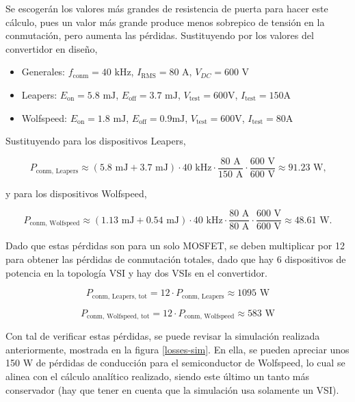 Se escogerán los valores más grandes de resistencia de puerta para hacer este cálculo, pues un valor más grande produce menos sobrepico de tensión en la conmutación, pero aumenta las pérdidas. Sustituyendo por los valores del convertidor en diseño,

\begin{itemize}
	\item Generales: \(f_{\text{conm}} = 40 \text{ kHz}\), \(I_{\text{RMS}} = 80 \text{ A}\), \(V_{DC} = 600 \text{ V}\)
	\item Leapers: \(E_{\text{on}} = 5.8 \text{ mJ}\), \(E_{\text{off}} = 3.7 \text{ mJ}\), \(V_{\text{test}} = 600 \text{V}\), \(I_{\text{test}} = 150 \text{A}\)
	\item Wolfspeed: \(E_{\text{on}} = 1.8 \text{ mJ}\), \(E_{\text{off}} = 0.9 \text{mJ}\), \(V_{\text{test}} = 600 \text{V}\), \(I_{\text{test}} = 80 \text{A}\)
\end{itemize}

Sustituyendo para los dispositivos Leapers,

\[
P_{\text{conm, Leapers}} \approx (5.8 \text{ mJ} + 3.7 \text{ mJ}) \cdot 40 \text{ kHz} \cdot \frac{80 \text{ A}}{150 \text{ A}} \cdot \frac{600 \text{ V}}{600 \text{ V}} \approx 91.23 \text{ W,}
\]

y para los dispositivos Wolfspeed,

\[
P_{\text{conm, Wolfspeed}} \approx (1.13 \text{ mJ} + 0.54 \text{ mJ}) \cdot 40 \text{ kHz} \cdot \frac{80  \text{ A}}{80 \text{ A}} \cdot \frac{600 \text{ V}}{600 \text{ V}} \approx 48.61 \text{ W.}
\]

Dado que estas pérdidas son para un solo MOSFET, se deben multiplicar por 12 para obtener las pérdidas de conmutación totales, dado que hay 6 dispositivos de potencia en la topología VSI y hay dos VSIs en el convertidor.

\[
P_{\text{conm, Leapers, tot}} = 12\cdot P_{\text{conm, Leapers}} \approx 1095 \text{ W}
\]

\[
P_{\text{conm, Wolfspeed, tot}} = 12\cdot P_{\text{conm, Wolfspeed}} \approx 583 \text{ W}
\]

Con tal de verificar estas pérdidas, se puede revisar la simulación realizada anteriormente, mostrada en la figura \ref{losses-sim}. En ella, se pueden apreciar unos 150 W de pérdidas de conducción para el semiconductor de Wolfspeed, lo cual se alinea con el cálculo analítico realizado, siendo este último un tanto más conservador (hay que tener en cuenta que la simulación usa solamente un VSI). 

